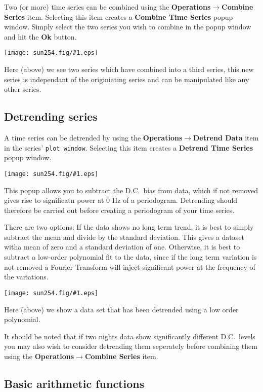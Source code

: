 \documentclass[twoside,11pt]{article}
\newcommand{\htmladdimg}[1]{}
\newcommand{\latexhtml}[2]{#1}
\newcommand{\xlabel}[1]{}
\renewcommand{\_}{\texttt{\symbol{95}}}
\newcommand{\mainfigure}[1]
{\begin{center}
 \latexhtml{\texttt{[image: sun254.fig/\#1.eps]}}{\htmladdimg{../sun254.fig/#1.gif}}
 \end{center}
}
\newcommand{\submenuitem}[2]{\latexhtml{\textbf{#1$\rightarrow$#2}}{\textbf{#1=>#2}}}
\newcommand{\labelitem}[1]{\textbf{#1}}
\newcommand{\hitext}[1]{\texttt{#1}}
\begin{document}
Two (or more) time series can be combined using the \submenuitem{Operations}{Combine Series} item. Selecting this item creates a \labelitem{Combine Time Series} popup window. Simply select the two series you wish to combine in the popup window and hit the \labelitem{Ok} button.

\mainfigure{combining_series}

Here (above) we see two series which have combined into a third series, this new series is independant of the originiating series and can be manipulated like any other series.

\subsection{Detrending series\xlabel{detrending_time_series}}

A time series can be detrended by using the \submenuitem{Operations}{Detrend Data} item in the series' \hitext{plot window}. Selecting this item creates a \labelitem{Detrend Time Series} popup window.

\mainfigure{detrend_popup}

This popup allows you to subtract the D.C.\ bias from data, which if not removed gives rise to significatn power at 0 Hz of a periodogram. Detrending should therefore be carried out before creating a periodogram of your time series.

There are two options: If the data shows no long term trend, it is best to simply subtract the mean and divide by the standard deviation. This gives a dataset witha mean of zero and a standard deviation of one. Otherwise, it is best to subtract a low-order polynomial fit to the data, since if the long term variation is not removed a Fourier Transform will inject significant power at the frequency of the variations.

\mainfigure{detrend_data}

Here (above) we show a data set that has been detrended using a low order polynomial.

It should be noted that if two nights data show significantly different D.C.\ levels you may also wish to consider detrending them seperately before combining them using the \submenuitem{Operations}{Combine Series} item.
 
\subsection{Basic arithmetic functions\xlabel{basic_arithmetic}}
\end{document}
